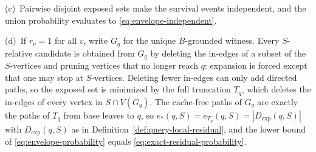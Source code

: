 \documentclass[10pt,a4paper]{amsart}
\makeatletter
\renewenvironment{proof}[1][\proofname]{\par
  \pushQED{\qed}%
  \normalfont \topsep6\p@\@plus6\p@\relax
  \trivlist
  \item[\hskip\labelsep
        \itshape
    #1\@addpunct{.}]\ignorespaces
}{%
  \popQED\endtrivlist\@endpefalse
}
\makeatother
\begin{document}
\begin{proof}
(c)\ Pairwise disjoint exposed sets make the survival events independent,
and the union probability evaluates to \eqref{eq:envelope-independent}.

(d)\ If \(r_v=1\) for all \(v\), write \(G_q\) for the unique \(B\)-grounded
witness.  Every \(S\)-relative candidate is obtained from \(G_q\) by deleting
the in-edges of a subset of the \(S\)-vertices and pruning vertices that no
longer reach \(q\): expansion is forced except that one may stop at
\(S\)-vertices.  Deleting fewer in-edges can only add directed paths, so the
exposed set is minimized by the full truncation \(T_q\), which deletes the
in-edges of every vertex in \(S\cap V(G_q)\).  The cache-free paths of
\(G_q\) are exactly the paths of \(T_q\) from base leaves to \(q\), so
\(e_*(q,S)=e_{T_q}(q,S)=|D_{\mathrm{exp}}(q,S)|\) with
\(D_{\mathrm{exp}}(q,S)\) as in
Definition~\ref{def:query-local-residual}, and the lower bound of
\eqref{eq:envelope-probability} equals
\eqref{eq:exact-residual-probability}.
\end{proof}
\end{document}
